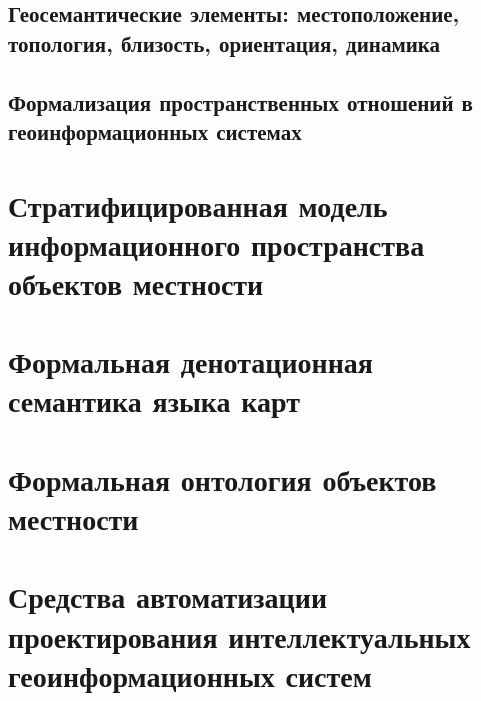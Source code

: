 \subsection{Геосемантические элементы: местоположение, топология, близость, ориентация, динамика}
\subsection{Формализация пространственных отношений в геоинформационных системах}
\section{Стратифицированная модель информационного пространства объектов местности}
\section{Формальная денотационная семантика языка карт}
\section{Формальная онтология объектов местности}
\section{Средства автоматизации проектирования интеллектуальных геоинформационных систем}

